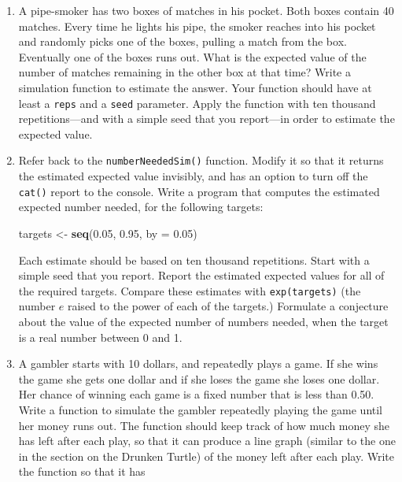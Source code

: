 \documentclass[]{book}
\makeatletter
\newenvironment{Shaded}{\begin{snugshade}}{\end{snugshade}}
\newcommand{\KeywordTok}[1]{\textcolor[rgb]{0.13,0.29,0.53}{\textbf{#1}}}
\newcommand{\DataTypeTok}[1]{\textcolor[rgb]{0.13,0.29,0.53}{#1}}
\newcommand{\FloatTok}[1]{\textcolor[rgb]{0.00,0.00,0.81}{#1}}
\newcommand{\StringTok}[1]{\textcolor[rgb]{0.31,0.60,0.02}{#1}}
\newcommand{\NormalTok}[1]{#1}
\newenvironment{kframe}{%
\medskip{}
\setlength{\fboxsep}{.8em}
 \def\at@end@of@kframe{}%
 \ifinner\ifhmode%
  \def\at@end@of@kframe{\end{minipage}}%
  \begin{minipage}{\columnwidth}%
 \fi\fi%
 \def\FrameCommand##1{\hskip\@totalleftmargin \hskip-\fboxsep
 \colorbox{shadecolor}{##1}\hskip-\fboxsep
     \hskip-\linewidth \hskip-\@totalleftmargin \hskip\columnwidth}%
 \MakeFramed {\advance\hsize-\width
   \@totalleftmargin\z@ \linewidth\hsize
   \@setminipage}}%
 {\par\unskip\endMakeFramed%
 \at@end@of@kframe}
\renewenvironment{Shaded}{\begin{kframe}}{\end{kframe}}
\theoremstyle{definition}
\theoremstyle{definition}
\theoremstyle{definition}
\theoremstyle{remark}
\makeatother
\begin{document}
{\begin{enumerate}
  Apply the function with ten thousand repetitions (and a simple seed
  that you report) in order to estimate the probability of a meeting,
  assuming that Anna is willing to wait 13 minutes and Raj is willing to
  wait 7 minutes.
\item
  A pipe-smoker has two boxes of matches in his pocket. Both boxes
  contain 40 matches. Every time he lights his pipe, the smoker reaches
  into his pocket and randomly picks one of the boxes, pulling a match
  from the box. Eventually one of the boxes runs out. What is the
  expected value of the number of matches remaining in the other box at
  that time? Write a simulation function to estimate the answer. Your
  function should have at least a \texttt{reps} and a \texttt{seed}
  parameter. Apply the function with ten thousand repetitions---and with
  a simple seed that you report---in order to estimate the expected
  value.
\item
  Refer back to the \texttt{numberNeededSim()} function. Modify it so
  that it returns the estimated expected value invisibly, and has an
  option to turn off the \texttt{cat()} report to the console. Write a
  program that computes the estimated expected number needed, for the
  following targets:

\begin{Shaded}
\begin{Highlighting}[]
\NormalTok{targets <-}\StringTok{ }\KeywordTok{seq}\NormalTok{(}\FloatTok{0.05}\NormalTok{, }\FloatTok{0.95}\NormalTok{, }\DataTypeTok{by =} \FloatTok{0.05}\NormalTok{)}
\end{Highlighting}
\end{Shaded}

  Each estimate should be based on ten thousand repetitions. Start with
  a simple seed that you report. Report the estimated expected values
  for all of the required targets. Compare these estimates with
  \texttt{exp(targets)} (the number \(e\) raised to the power of each of
  the targets.) Formulate a conjecture about the value of the expected
  number of numbers needed, when the target is a real number between 0
  and 1.
\item
  A gambler starts with 10 dollars, and repeatedly plays a game. If she
  wins the game she gets one dollar and if she loses the game she loses
  one dollar. Her chance of winning each game is a fixed number that is
  less than 0.50. Write a function to simulate the gambler repeatedly
  playing the game until her money runs out. The function should keep
  track of how much money she has left after each play, so that it can
  produce a line graph (similar to the one in the section on the Drunken
  Turtle) of the money left after each play. Write the function so that
  it has


\end{enumerate}}
\end{document}
